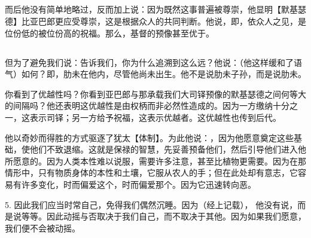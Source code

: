 
\subsection{}

而后他没有简单地略过，反而加上说：因为既然这事普遍被尊崇，他显明【默基瑟德】比亚巴郎更应受尊崇，这是根据众人的共同判断。他说，即，依众人之见，是位份低的被位份高的祝福。那么，基督的预像甚至优于。\par


\subsection{}

但为了避免我们说：告诉我们，你为什么追溯到这么远？他说：（他这样缓和了语气）如何？即，肋未在他内，尽管他尚未出生。他不是说肋未子孙，而是说肋未。\par

你看到了优越性吗？你看到亚巴郎与那承载我们大司铎预像的默基瑟德之间何等大的间隔吗？他还表明这优越性是由权柄而非必然性造成的。因为一方缴纳十分之一，这表示司铎；另一方给予祝福，这表示优越者。这优越性也传到后代。\par

他以奇妙而得胜的方式驱逐了犹太【体制】。为此他说：，因为他愿意奠定这些基础，使他们不致退缩。这就是保禄的智慧，先妥善预备他们，然后引导他们进入他所愿意的。因为人类本性难以说服，需要许多注意，甚至比植物更需要。因为在那情形中，只有物质身体的本性和土壤，它服从农人的手；但在此处却有意志，它容易有许多变化，时而偏爱这个，时而偏爱那个。因为它迅速转向恶。\par

5. 因此我们应当时常自己，免得我们偶然沉睡。因为（经上记载）， 他没有说，而是说等等。因此动摇与否取决于我们自己，而不取决于其他。因为如果我们愿意，我们便不会被动摇。\par

